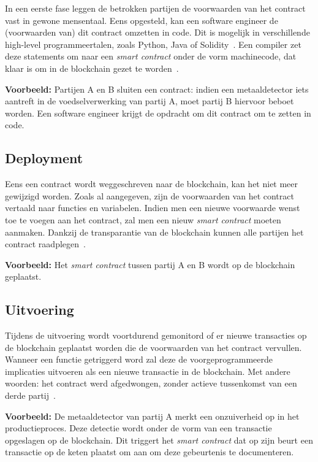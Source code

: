 In een eerste fase leggen de betrokken partijen de voorwaarden van het contract vast in gewone mensentaal. Eens opgesteld, kan een software engineer de (voorwaarden van) dit contract omzetten in code. Dit is mogelijk in verschillende high-level programmeertalen, zoals Python, Java of Solidity~\autocite{Bahga2016}. Een compiler zet deze statements om naar een \textit{smart contract} onder de vorm machinecode, dat klaar is om in de blockchain gezet te worden~\autocite{Zheng2019}.

\textbf{Voorbeeld:}
Partijen A en B sluiten een contract: indien een metaaldetector iets aantreft in de voedselverwerking van partij A, moet partij B hiervoor beboet worden. Een software engineer krijgt de opdracht om dit contract om te zetten in code.

\subsection{Deployment}
\label{sub:deployment}

Eens een contract wordt weggeschreven naar de blockchain, kan het niet meer gewijzigd worden. Zoals al aangegeven, zijn de voorwaarden van het contract vertaald naar functies en variabelen. Indien men een nieuwe voorwaarde wenst toe te voegen aan het contract, zal men een nieuw \textit{smart contract} moeten aanmaken. Dankzij de transparantie van de blockchain kunnen alle partijen het contract raadplegen~\autocite{Zheng2019}.

\textbf{Voorbeeld:}
Het \textit{smart contract} tussen partij A en B wordt op de blockchain geplaatst.

\subsection{Uitvoering}
\label{sub:uitvoering}

Tijdens de uitvoering wordt voortdurend gemonitord of er nieuwe transacties op de blockchain geplaatst worden die de voorwaarden van het contract vervullen. Wanneer een functie getriggerd word zal deze de voorgeprogrammeerde implicaties uitvoeren als een nieuwe transactie in de blockchain. Met andere woorden: het contract werd afgedwongen, zonder actieve tussenkomst van een derde partij~\autocite{Delmolino2016}.

\textbf{Voorbeeld:}
De metaaldetector van partij A merkt een onzuiverheid op in het productieproces. Deze detectie wordt onder de vorm van een transactie opgeslagen op de blockchain. Dit triggert het \textit{smart contract} dat op zijn beurt een transactie op de keten plaatst om aan om deze gebeurtenis te documenteren.

